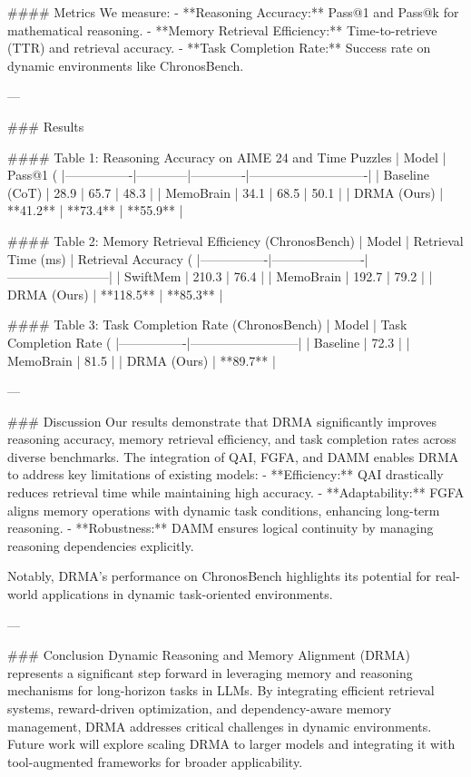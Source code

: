 #### Metrics
We measure:
- **Reasoning Accuracy:** Pass@1 and Pass@k for mathematical reasoning.
- **Memory Retrieval Efficiency:** Time-to-retrieve (TTR) and retrieval accuracy.
- **Task Completion Rate:** Success rate on dynamic environments like ChronosBench.

---

### Results

#### Table 1: Reasoning Accuracy on AIME 24 and Time Puzzles
| Model          | Pass@1 (%
|----------------|------------|-------------|----------------------------|
| Baseline (CoT) | 28.9       | 65.7        | 48.3                       |
| MemoBrain      | 34.1       | 68.5        | 50.1                       |
| DRMA (Ours)    | **41.2**   | **73.4**    | **55.9**                   |

#### Table 2: Memory Retrieval Efficiency (ChronosBench)
| Model          | Retrieval Time (ms) | Retrieval Accuracy (%
|----------------|----------------------|------------------------|
| SwiftMem       | 210.3               | 76.4                   |
| MemoBrain      | 192.7               | 79.2                   |
| DRMA (Ours)    | **118.5**           | **85.3**               |

#### Table 3: Task Completion Rate (ChronosBench)
| Model          | Task Completion Rate (%
|----------------|--------------------------|
| Baseline       | 72.3                     |
| MemoBrain      | 81.5                     |
| DRMA (Ours)    | **89.7**                 |

---

### Discussion
Our results demonstrate that DRMA significantly improves reasoning accuracy, memory retrieval efficiency, and task completion rates across diverse benchmarks. The integration of QAI, FGFA, and DAMM enables DRMA to address key limitations of existing models:
- **Efficiency:** QAI drastically reduces retrieval time while maintaining high accuracy.
- **Adaptability:** FGFA aligns memory operations with dynamic task conditions, enhancing long-term reasoning.
- **Robustness:** DAMM ensures logical continuity by managing reasoning dependencies explicitly.

Notably, DRMA's performance on ChronosBench highlights its potential for real-world applications in dynamic task-oriented environments.

---

### Conclusion
Dynamic Reasoning and Memory Alignment (DRMA) represents a significant step forward in leveraging memory and reasoning mechanisms for long-horizon tasks in LLMs. By integrating efficient retrieval systems, reward-driven optimization, and dependency-aware memory management, DRMA addresses critical challenges in dynamic environments. Future work will explore scaling DRMA to larger models and integrating it with tool-augmented frameworks for broader applicability.

